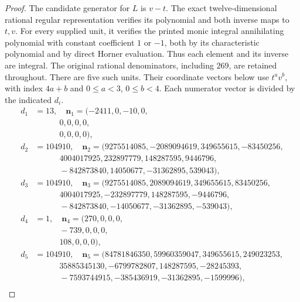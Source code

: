 \begin{proof}
The candidate generator for $L$ is $v-t$.
The exact twelve-dimensional rational regular representation verifies
its polynomial and both inverse maps to $t,v$.
For every supplied unit, it verifies the printed monic integral
annihilating polynomial with constant coefficient $1$ or $-1$,
both by its characteristic polynomial and by direct Horner evaluation.
Thus each element and its inverse are integral.  The original
rational denominators, including $269$, are retained throughout.
There are five such units.  Their coordinate vectors below use
$t^av^b$, with index $4a+b$ and $0\leq a<3$, $0\leq b<4$.
Each numerator vector is divided by the indicated $d_i$.
\[
\begin{aligned}
 d_{1}&=13,\quad\mathbf n_{1}=(-2411,0,-10,0,\\
 &\hspace{3em}0,0,0,0,\\
 &\hspace{3em}0,0,0,0),\\
 d_{2}&=104910,\quad\mathbf n_{2}=(9275514085,-2089094619,349655615,-83450256,\\
 &\hspace{3em}4004017925,232897779,148287595,9446796,\\
 &\hspace{3em}-842873840,14050677,-31362895,539043),\\
 d_{3}&=104910,\quad\mathbf n_{3}=(9275514085,2089094619,349655615,83450256,\\
 &\hspace{3em}4004017925,-232897779,148287595,-9446796,\\
 &\hspace{3em}-842873840,-14050677,-31362895,-539043),\\
 d_{4}&=1,\quad\mathbf n_{4}=(270,0,0,0,\\
 &\hspace{3em}-739,0,0,0,\\
 &\hspace{3em}108,0,0,0),\\
 d_{5}&=104910,\quad\mathbf n_{5}=(84781846350,59960359047,349655615,249023253,\\
 &\hspace{3em}35885345130,-6799782807,148287595,-28245393,\\
 &\hspace{3em}-7593744915,-385436919,-31362895,-1599996),\\
\end{aligned}
\]
\end{proof}
